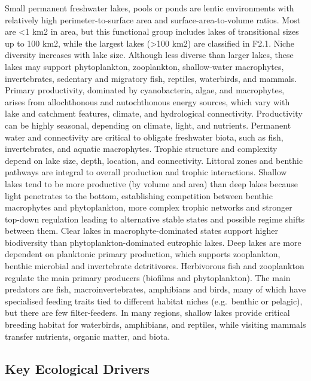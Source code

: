 \documentclass[
  letterpaper,
  DIV=11,
  numbers=noendperiod]{scrartcl}
\begin{document}
Small permanent freshwater lakes, pools or ponds are lentic environments
with relatively high perimeter-to-surface area and
surface-area-to-volume ratios. Most are \textless1 km2 in area, but this
functional group includes lakes of transitional sizes up to 100 km2,
while the largest lakes (\textgreater100 km2) are classified in F2.1.
Niche diversity increases with lake size. Although less diverse than
larger lakes, these lakes may support phytoplankton, zooplankton,
shallow-water macrophytes, invertebrates, sedentary and migratory fish,
reptiles, waterbirds, and mammals. Primary productivity, dominated by
cyanobacteria, algae, and macrophytes, arises from allochthonous and
autochthonous energy sources, which vary with lake and catchment
features, climate, and hydrological connectivity. Productivity can be
highly seasonal, depending on climate, light, and nutrients. Permanent
water and connectivity are critical to obligate freshwater biota, such
as fish, invertebrates, and aquatic macrophytes. Trophic structure and
complexity depend on lake size, depth, location, and connectivity.
Littoral zones and benthic pathways are integral to overall production
and trophic interactions. Shallow lakes tend to be more productive (by
volume and area) than deep lakes because light penetrates to the bottom,
establishing competition between benthic macrophytes and phytoplankton,
more complex trophic networks and stronger top-down regulation leading
to alternative stable states and possible regime shifts between them.
Clear lakes in macrophyte-dominated states support higher biodiversity
than phytoplankton-dominated eutrophic lakes. Deep lakes are more
dependent on planktonic primary production, which supports zooplankton,
benthic microbial and invertebrate detritivores. Herbivorous fish and
zooplankton regulate the main primary producers (biofilms and
phytoplankton). The main predators are fish, macroinvertebrates,
amphibians and birds, many of which have specialised feeding traits tied
to different habitat niches (e.g.~benthic or pelagic), but there are few
filter-feeders. In many regions, shallow lakes provide critical breeding
habitat for waterbirds, amphibians, and reptiles, while visiting mammals
transfer nutrients, organic matter, and biota.

\subsection{Key Ecological Drivers}\label{key-ecological-drivers-118}
\end{document}
